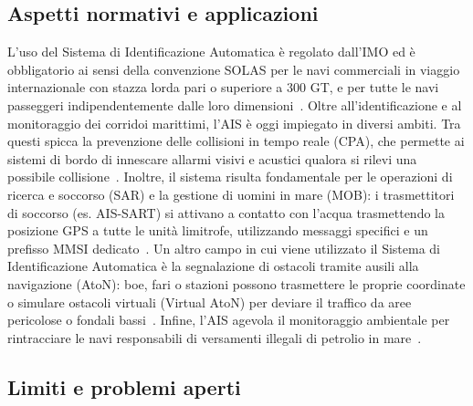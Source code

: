 \subsection{Aspetti normativi e applicazioni}
\label{sec:aspetti_normativi}

L'uso del Sistema di Identificazione Automatica è regolato dall'\ac{IMO} ed è obbligatorio ai sensi della convenzione \ac{SOLAS} per le navi commerciali in viaggio internazionale con stazza lorda pari o superiore a 300 \ac{GT}, e per tutte le navi passeggeri indipendentemente dalle loro dimensioni~\cite{10.1145/2664243.2664257, solas_mtsa_2015}. Oltre all'identificazione e al monitoraggio dei corridoi marittimi, l'\ac{AIS} è oggi impiegato in diversi ambiti. Tra questi spicca la prevenzione delle collisioni in tempo reale (\ac{CPA}), che permette ai sistemi di bordo di innescare allarmi visivi e acustici qualora si rilevi una possibile collisione~\cite{10.1145/2664243.2664257}. Inoltre, il sistema risulta fondamentale per le operazioni di ricerca e soccorso (\ac{SAR}) e la gestione di uomini in mare (\ac{MOB}): i trasmettitori di soccorso (es. \ac{AIS-SART}) si attivano a contatto con l'acqua trasmettendo la posizione \ac{GPS} a tutte le unità limitrofe, utilizzando messaggi specifici e un prefisso \ac{MMSI} dedicato~\cite{10.1145/2664243.2664257, itu_m1371_6}.
Un altro campo in cui viene utilizzato il Sistema di Identificazione Automatica è la segnalazione di ostacoli tramite ausili alla navigazione (\ac{AtoN}): boe, fari o stazioni possono trasmettere le proprie coordinate o simulare ostacoli virtuali (Virtual \ac{AtoN}) per deviare il traffico da aree pericolose o fondali bassi~\cite{10.1145/2664243.2664257, itu_m1371_6}. Infine, l'\ac{AIS} agevola il monitoraggio ambientale per rintracciare le navi responsabili di versamenti illegali di petrolio in mare~\cite{10.1145/2664243.2664257}.

\subsection{Limiti e problemi aperti}
\label{sec:limiti}

